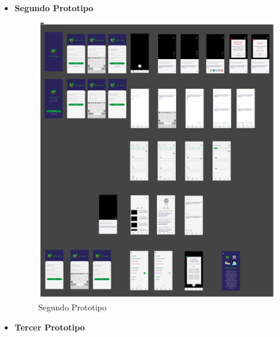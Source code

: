 \begin{itemize}
    
    \item \textbf{Segundo Prototipo} 

    \begin{figure} [H]
        \centering
        \includegraphics[width=1\linewidth]{figuras/segundo_prototipo.png}
        \caption{Segundo Prototipo}
        \label{fig:enter-label}
    \end{figure}


    \item \textbf{Tercer Prototipo} 


\end{itemize}
